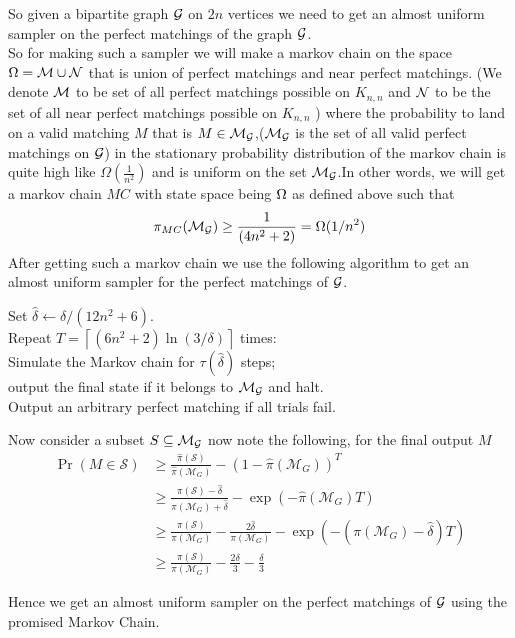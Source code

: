 \begin{flushleft}
	So given a bipartite graph $\mathcal{G}$ on $2n$ vertices we need to get an almost uniform sampler on the perfect matchings of the graph $\mathcal{G}$.\\
	So for making such a sampler we will make a markov chain on the space $\Omega = \mathcal{M} \cup \mathcal{N} $ that is union of perfect matchings and near perfect matchings. (We denote $\mathcal{M}$ to be set of all perfect matchings possible on $K_{n,n}$ and $\mathcal{N}$ to be the set of all near perfect matchings possible on $K_{n,n}$ ) where the probability to land on a valid matching $M$ that is $M\in \mathcal{M}_{\mathcal{G}}$,($\mathcal{M}_{\mathcal{G}}$ is the set of all valid perfect matchings on $\mathcal{G}$) in the stationary probability distribution of the markov chain is quite high like $\Omega(\frac{1}{n^2})$ and is uniform on the set $\mathcal{M}_{\mathcal{G}}$.In other words, we will get a markov chain $MC$ with state space being $\Omega$ as defined above such that
	$$\pi_{MC}(\mathcal{M}_{\mathcal{G}} )\geq \frac{1}{(4n^2+2)} = \Omega(1/n^2)$$
	   After getting such a markov chain we use the following algorithm to get an almost uniform sampler for the perfect matchings of $\mathcal{G}$.
\end{flushleft}
\begin{flushleft}
	Set $\hat{\delta} \leftarrow \delta /\left(12 n^2+6\right)$.\\
	Repeat $T=\left\lceil\left(6 n^2+2\right) \ln (3 / \delta)\right\rceil$ times:\\
	\parinn Simulate the Markov chain for $\tau(\hat{\delta})$ steps;\\ output the final state if it belongs to $\mathcal{M_{\mathcal{G}}}$ and halt.\\ \parinf Output an arbitrary perfect matching if all trials fail.
\end{flushleft}
\begin{flushleft}
	Now consider a subset $S\subseteq \mathcal{M}_{\mathcal{G}}$ now note the following, for the final output $M$ 
	\begin{align*}
		\operatorname{Pr}(M \in \mathcal{S}) & \geq \frac{\hat{\pi}(\mathcal{S})}{\hat{\pi}(\mathcal{M}_G)}-(1-\hat{\pi}(\mathcal{M}_G))^T \\
		& \geq \frac{\pi(\mathcal{S})-\hat{\delta}}{\pi(\mathcal{M}_G)+\hat{\delta}}-\exp (-\hat{\pi}(\mathcal{M}_G) T) \\
		& \geq \frac{\pi(\mathcal{S})}{\pi(\mathcal{M}_G)}-\frac{2 \hat{\delta}}{\pi(\mathcal{M}_G)}-\exp (-(\pi(\mathcal{M}_G)-\hat{\delta}) T) \\
		& \geq \frac{\pi(\mathcal{S})}{\pi(\mathcal{M}_G)}-\frac{2 \delta}{3}-\frac{\delta}{3}
	\end{align*}
\end{flushleft}
Hence we get an almost uniform sampler on the perfect matchings of $\mathcal{G}$ using the promised Markov Chain.

